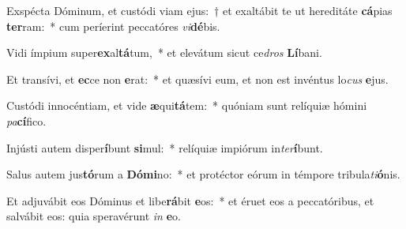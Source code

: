 \item Exspécta Dóminum, et custódi viam ejus:~† et exaltábit te ut hereditáte \textbf{cá}pias \textbf{ter}ram:~* cum períerint peccatóres \textit{vi}\textbf{dé}bis.
\item Vidi ímpium super\textbf{ex}al\textbf{tá}tum,~* et elevátum sicut ce\textit{dros} \textbf{Lí}bani.
\item Et transívi, et \textbf{ec}ce non \textbf{e}rat:~* et quæsívi eum, et non est invéntus lo\textit{cus} \textbf{e}jus.
\item Custódi innocéntiam, et vide \textbf{æ}qui\textbf{tá}tem:~* quóniam sunt relíquiæ hómini \textit{pa}\textbf{cí}fico.
\item Injústi autem disper\textbf{í}bunt \textbf{si}mul:~* relíquiæ impiórum in\textit{ter}\textbf{í}bunt.
\item Salus autem jus\textbf{tó}rum a \textbf{Dó}\textbf{mi}no:~* et protéctor eórum in témpore tribula\textit{ti}\textbf{ó}nis.
\item Et adjuvábit eos Dóminus et libe\textbf{rá}bit \textbf{e}os:~* et éruet eos a peccatóribus, et salvábit eos: quia speravérunt \textit{in} \textbf{e}o.
